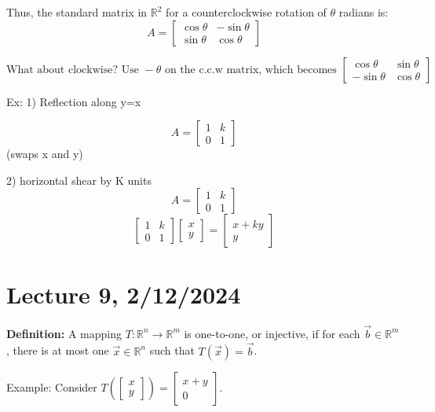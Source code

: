 \documentclass{article}
\begin{document}
Thus, the standard matrix in $\mathbb{R}^2$ for a counterclockwise rotation of $\theta$ radians is:
\[ A = \begin{bmatrix} \cos \theta & -\sin \theta \\ \sin \theta & \cos \theta \end{bmatrix} \]


\[
\text{What about clockwise? Use } -\theta \text{ on the c.c.w matrix, which becomes } \begin{bmatrix} \cos \theta & \sin \theta \\ -\sin \theta & \cos \theta \end{bmatrix}
\]


Ex: 1) Reflection along y=x

\[ A = \begin{bmatrix} 1 & k \\ 0 & 1 \end{bmatrix} \]
(swaps x and y)

2) horizontal shear by K units 
\[ A = \begin{bmatrix} 1 & k \\ 0 & 1 \end{bmatrix} \]
\[\begin{bmatrix} 1 & k \\ 0 & 1 \end{bmatrix} \begin{bmatrix} x \\ y \end{bmatrix} = \begin{bmatrix} x+ky \\ y \end{bmatrix}\]



\section{Lecture 9, 2/12/2024}

\textbf{Definition:} A mapping $T: \mathbb{R}^n \rightarrow \mathbb{R}^m$ is one-to-one, or injective, if for each $\vec{b} \in \mathbb{R}^m$, there is at most one $\vec{x} \in \mathbb{R}^n$ such that $T(\vec{x}) = \vec{b}$.

Example: Consider $T(\begin{bmatrix} x \\ y \end{bmatrix}) = \begin{bmatrix} x + y \\ 0 \end{bmatrix}$. 
\end{document}

